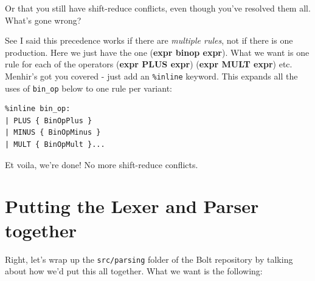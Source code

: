 Or that you still have shift-reduce conflicts, even though you've
resolved them all. What's gone wrong?

See I said this precedence works if there are \emph{multiple rules}, not
if there is one production. Here we just have the one (\textbf{expr
binop expr}). What we want is one rule for each of the operators
(\textbf{expr PLUS expr}) (\textbf{expr MULT expr}) etc. Menhir's got
you covered - just add an \texttt{\%inline} keyword. This expands all
the uses of \texttt{bin\_op} below to one rule per variant:

%

\begin{verbatim}
%inline bin_op:
| PLUS { BinOpPlus }
| MINUS { BinOpMinus }
| MULT { BinOpMult }...
\end{verbatim}

Et voila, we're done! No more shift-reduce conflicts.



%
%

\hypertarget{putting-the-lexer-and-parser-together}{%
\section{\texorpdfstring{\protect\hyperlink{putting-the-lexer-and-parser-together}{}Putting
the Lexer and Parser
together}{Putting the Lexer and Parser together}}\label{putting-the-lexer-and-parser-together}}

Right, let's wrap up the \texttt{src/parsing} folder of the Bolt
repository by talking about how we'd put this all together. What we want
is the following:

